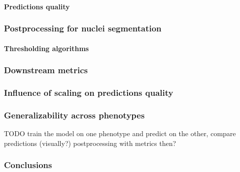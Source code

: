         \paragraph{Predictions quality}
            \label{section:nuclei-predictions}
              
    \subsubsection{Postprocessing for nuclei segmentation}
        
        \paragraph{Thresholding algorithms}
        
    \subsubsection{Downstream metrics}
        
    \subsubsection{Influence of scaling on predictions quality}
        
    \subsubsection{Generalizability across phenotypes}
        TODO train the model on one phenotype and predict on the other, compare predictions (visually?)
        postprocessing with metrics then?

    \subsubsection{Conclusions}
        

